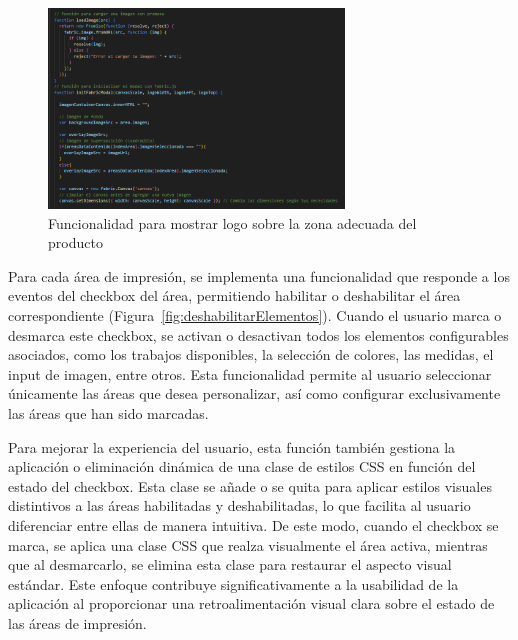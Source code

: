 \documentclass[11pt]{article}
\begin{document}
\begin{figure}[H]
    \centering
    \includegraphics[width=0.7\textwidth]{imagenesUS3-modal/FuncionalidadEspecialImagen.png}
    \caption{\label{fig:pintarLogo} Funcionalidad para mostrar logo sobre la zona adecuada del producto}
    \vspace{\fill}
\end{figure}

Para cada área de impresión, se implementa una funcionalidad que responde a los eventos del checkbox del área, permitiendo habilitar o deshabilitar 
el área correspondiente (Figura~\ref{fig:deshabilitarElementos}). Cuando el usuario marca o desmarca este checkbox, se activan o desactivan todos los elementos configurables asociados, 
como los trabajos disponibles, la selección de colores, las medidas, el input de imagen, entre otros. Esta funcionalidad permite al usuario seleccionar
únicamente las áreas que desea personalizar, así como configurar exclusivamente las áreas que han sido marcadas.

Para mejorar la experiencia del usuario, esta función también gestiona la aplicación o eliminación dinámica de una clase de estilos CSS en función del 
estado del checkbox. Esta clase se añade o se quita para aplicar estilos visuales distintivos a las áreas habilitadas y deshabilitadas, lo que facilita 
al usuario diferenciar entre ellas de manera intuitiva. De este modo, cuando el checkbox se marca, se aplica una clase CSS que realza visualmente el área activa,
mientras que al desmarcarlo, se elimina esta clase para restaurar el aspecto visual estándar. Este enfoque contribuye significativamente a la usabilidad de la 
aplicación al proporcionar una retroalimentación visual clara sobre el estado de las áreas de impresión.
\end{document}
